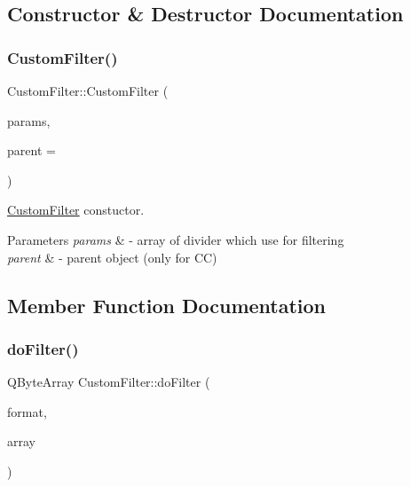 \subsection{Constructor \& Destructor Documentation}
\hypertarget{class_custom_filter_aea563fa1531896e1e6427c42e8694ecf}{}\label{class_custom_filter_aea563fa1531896e1e6427c42e8694ecf} 
\subsubsection{\texorpdfstring{Custom\+Filter()}{CustomFilter()}}
{\footnotesize\ttfamily Custom\+Filter\+::\+Custom\+Filter (\begin{DoxyParamCaption}\item[{Q\+List$<$ float $>$}]{params,  }\item[{Q\+Object $\ast$}]{parent = {} }\end{DoxyParamCaption})}



\hyperlink{class_custom_filter}{Custom\+Filter} constuctor. 


\begin{DoxyParams}{Parameters}
{\em params} & -\/ array of divider which use for filtering \\
\hline
{\em parent} & -\/ parent object (only for CC) \\
\hline
\end{DoxyParams}


\subsection{Member Function Documentation}
\hypertarget{class_custom_filter_aafa4ccbab26275b5ef223158cbb684ab}{}\label{class_custom_filter_aafa4ccbab26275b5ef223158cbb684ab} 
\subsubsection{\texorpdfstring{do\+Filter()}{doFilter()}}
{\footnotesize\ttfamily Q\+Byte\+Array Custom\+Filter\+::do\+Filter (\begin{DoxyParamCaption}\item[{Q\+Audio\+Format}]{format,  }\item[{Q\+Byte\+Array}]{array }\end{DoxyParamCaption})\hspace{0.3cm}{\ttfamily [virtual]}}



